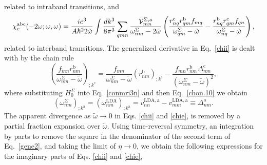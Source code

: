 \documentclass[floatfix,prb,aps,superscriptaddress,showpacs,11pt,preprint,letterpaper]{revtex4}
\begin{document}
related to intraband transitions, and 
\begin{equation}
\chi^{\mathrm{a}\mathrm{b}\mathrm{c}}_e (-2\omega;\omega,\omega)
=\frac{ie^3}{A\hbar^22\tilde\omega}
\int \frac{dk^3}{8\pi^3}
\sum_{qmn}
\frac{{\mathbf{\cal V}}_{mn}^{\Sigma,\mathrm{a}}}{\omega^\Sigma_{nm}-2\tilde\omega}
\left(
\frac{r_{nq}^{\mathrm{c}} r_{qm}^{\mathrm{b}} 
f_{mq}}{\omega^\Sigma_{qm}-\tilde\omega}
-\frac{r_{nq}^{\mathrm{b}} r_{qm}^{\mathrm{c}} 
f_{qn}}{\omega^\Sigma_{nq}-\tilde\omega}
\right),
\label{chie}
\end{equation} 
related to interband transitions.
The generalized derivative in Eq.~\eqref{chii} is dealt with by the chain rule 
\begin{equation}
\left(\frac{f_{mn}r_{nm}^{\mathrm{b}}}{\omega^\Sigma_{nm}-\tilde\omega}\right)_{;k^{\mathrm{c}}}=
\frac{f_{mn}}{\omega^\Sigma_{nm}-\tilde\omega}\left(r_{nm}^\mathrm{b}\right)_{;k^{\mathrm{c}}}
-\frac{f_{mn}r_{nm}^{\mathrm{b}}\Delta_{nm}^\mathrm{c}}{(\omega^\Sigma_{nm}-\tilde\omega)^2}
,
\label{gene2}
\end{equation}
where substituting $H^\Sigma_0$ 
into Eq.~\eqref{conmri3n} and then
Eq.~\eqref{chon.10}
we obtain
\begin{equation*}
\left(\omega^\Sigma_{nm}\right)_{;k^{\mathrm{a}}}
=
\left(\omega^\mathrm{LDA}_{nm}\right)_{;k^{\mathrm{a}}}
= 
v_{nn}^{\mathrm{LDA},\mathrm{a}}-v_{mm}^{\mathrm{LDA},\mathrm{a}}\equiv\Delta_{nm}^{\mathrm{a}}
.
\end{equation*} 
The apparent divergence as $\tilde\omega\to 0$
in Eqs. \eqref{chii} and \eqref{chie},  
is removed  by
 a partial fraction expansion over $\tilde\omega$. 
Using time-reversal symmetry, an integration by parts to 
remove the square in the denominator of the second term of Eq.~\eqref{gene2}, 
and taking the limit of $\eta\to 0$, 
we obtain the following expressions for the imaginary parts of 
Eqs. \eqref{chii} and \eqref{chie}, 
\end{document}
